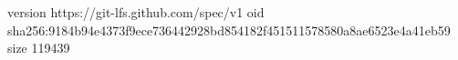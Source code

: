 version https://git-lfs.github.com/spec/v1
oid sha256:9184b94e4373f9ece736442928bd854182f451511578580a8ae6523e4a41eb59
size 119439
